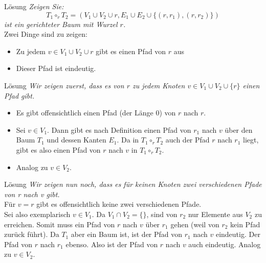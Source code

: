 \begin{frame}{Lösung}
	\textit{Zeigen Sie: $$T_1 \circ_r T_2 = (V_1 \cup V_2 \cup {r}, E_1 \cup E_2 \cup \{(r, r_1 ), (r, r_2 )\})$$ ist ein gerichteter Baum mit Wurzel $r$.} \\[2em] \pause
	Zwei Dinge sind zu zeigen:
	\begin{itemize}[<+->]
		\item Zu jedem $v \in V_1 \cup V_2 \cup {r}$ gibt es einen Pfad von $r$ aus
		\item Dieser Pfad ist eindeutig.
	\end{itemize}
\end{frame}

\begin{frame}{Lösung}
	\textit{Wir zeigen zuerst, dass es von $r$ zu jedem Knoten $v \in V_1 \cup V_2 \cup \{r\}$ einen Pfad
gibt.} \\[2em]
	\pause
	\begin{itemize}[<+->]
		\item Es gibt offensichtlich einen Pfad (der Länge 0) von $r$ nach $r$.
		\item Sei $v \in V_1$. Dann gibt es nach Definition einen Pfad von $r_1$ nach $v$ über den Baum $T_1$ und dessen Kanten $E_1$. Da in $T_1 \circ_r T_2$ auch der Pfad $r$ nach $r_1$ liegt, gibt es also einen Pfad von $r$ nach $v$ in $T_1 \circ_r T_2$.
		\item Analog zu $v \in V_2$.
	\end{itemize}
\end{frame}

\begin{frame}{Lösung}
	\textit{Wir zeigen nun noch, dass es für keinen Knoten zwei verschiedenen Pfade von r nach v gibt.} \\[2em]\pause
	Für $v = r$ gibt es offensichtlich keine zwei verschiedenen Pfade. \pause \\ Sei also exemplarisch $v \in V_1$. Da $V_1 \cap V_2 = \{\}$, sind von $r_2$ nur Elemente aus $V_2$ zu erreichen. Somit muss ein Pfad von $r$ nach $v$ über $r_1$ gehen (weil von $r_2$ kein Pfad zurück führt). \pause Da $T_1$ aber ein Baum ist, ist der Pfad von $r_1$ nach $v$ eindeutig. Der Pfad von $r$ nach $r_1$ ebenso. \pause Also ist der Pfad von $r$ nach $v$ auch eindeutig. Analog zu $v \in V_2$.
\end{frame}

